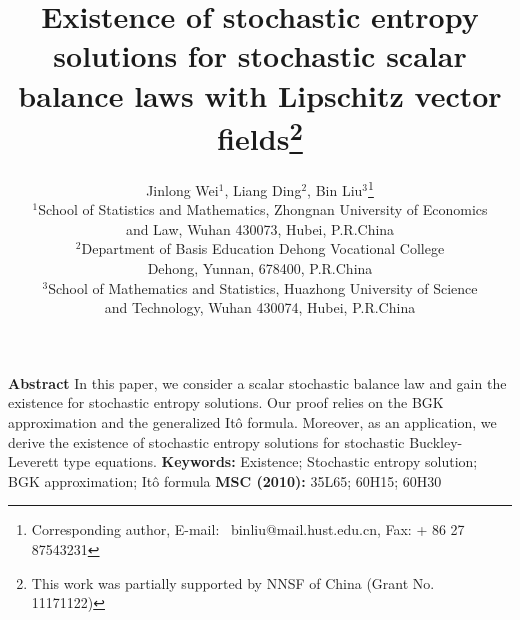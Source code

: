 \documentclass[11pt]{article}
\begin{document}
\title{\bf
Existence of stochastic entropy solutions for stochastic scalar
balance laws with Lipschitz vector fields\thanks{This work was
partially supported by NNSF of China
       (Grant No. 11171122)}}
\author{Jinlong  Wei$^1$, Liang Ding$^2$, Bin Liu$^3$\thanks{Corresponding author, E-mail:
\ binliu@mail.hust.edu.cn,  Fax: + 86 27 87543231} \\
$^1$School of Statistics and Mathematics, Zhongnan University of
Economics  \\ and Law, Wuhan 430073, Hubei, P.R.China
\\ $^2$Department of Basis Education
Dehong Vocational College \\ Dehong, Yunnan, 678400, P.R.China
\\
$^3$School of Mathematics and Statistics, Huazhong University of
Science \\ and Technology, Wuhan 430074, Hubei, P.R.China}
\date{}
 \maketitle
\noindent{\hrulefill}
\vskip1mm\noindent
 {\bf Abstract}  In this paper, we consider a scalar stochastic balance law and gain
the existence for stochastic entropy solutions. Our proof relies on
the BGK approximation and the generalized It\^{o} formula. Moreover,
as an application, we derive the existence of stochastic entropy
solutions for stochastic Buckley-Leverett type equations.
  \vskip2mm\noindent
{\bf Keywords:}  Existence; Stochastic entropy solution; BGK
approximation; It\^{o} formula
  \vskip2mm\noindent
{\bf MSC (2010):} 35L65; 60H15; 60H30
 \vskip0mm\noindent{\hrulefill}
\end{document}
